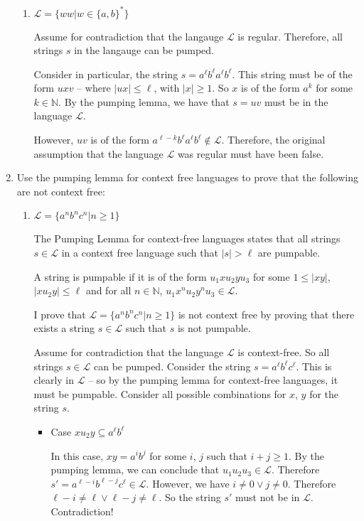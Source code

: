 \documentclass[10pt,\jkfside,a4paper]{article}
\begin{document}
\begin{enumerate}
\begin{enumerate}
\item $\mathcal L = \{ww| w \in \{a, b\}^*\}$

Assume for contradiction that the langauge $\mathcal L$ is regular.
Therefore, all strings $s$ in the langauge can be pumped.

Consider in particular, the string $s = a^\ell b^\ell a^\ell b^\ell$. This
string must be of the form $uxv$ -- where $|ux| \le \ell$, with $|x| \ge 1$.
So $x$ is of the form $a^k$ for some $k \in \mathbb N$. By the pumping
lemma, we have that $s = uv$ must be in the language $\mathcal L$.

However, $uv$ is of the form $a^{\ell - k} b^\ell a^\ell b^\ell \notin
\mathcal L$. Therefore, the original assumption that the language $\mathcal
L$ was regular must have been false.

\end{enumerate}

\item Use the pumping lemma for context free languages to prove that the
following are not context free:

\begin{enumerate}

\item $\mathcal L = \{a^n b^n c^n | n \ge 1\}$

The Pumping Lemma for context-free languages states that all strings $s \in
\mathcal L$ in a context free language such that $|s| > \ell$ are pumpable.

A string is pumpable if it is of the form $u_1 x u_2 y u_3$ for some $1 \le
|xy|$, $|x u_2 y| \le \ell$ and for all $n \in \mathbb N$, $u_1 x^n
u_2 y^n u_3 \in \mathcal L$.

I prove that $\mathcal L = \{a^n b^n c^n | n \ge 1\}$ is not context free by
proving that there exists a string $s \in \mathcal L$ such that $s$ is not
pumpable.

Assume for contradiction that the language $\mathcal L$ is context-free. So
all strings $s \in \mathcal L$ can be pumped. Consider the string $s =
a^\ell b^\ell c^\ell$. This is clearly in $\mathcal L$ -- so by the pumping
lemma for context-free languages, it must be pumpable. Consider all possible
combinations for $x$, $y$ for the string $s$.

\begin{itemize}

\item Case $x u_2 y \subseteq a^\ell b^\ell$

In this case, $xy = a^i b^j$ for some $i$, $j$ such that $i + j \ge 1$. By the
pumping lemma, we can conclude that $u_1 u_2 u_3 \in \mathcal L$. Therefore
$s' = a^{\ell - i} b^{\ell - j} c^{\ell} \in \mathcal L$. However, we have $i
\neq 0 \vee j \neq 0$. Therefore ${\ell - i} \neq \ell \vee \ell - j \neq
\ell$. So the string $s'$ must not be in $\mathcal L$. Contradiction!


\end{itemize}
\end{enumerate}
\end{enumerate}
\end{document}
